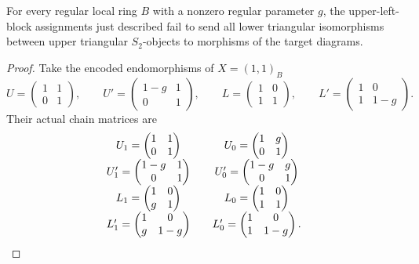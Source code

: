 \begin{lemma}\label{lem:triangular-naturality-failure}
For every regular local ring $B$ with a nonzero regular parameter $g$,
the upper-left-block assignments just described fail to send all
lower triangular isomorphisms between upper triangular $S_2$-objects
to morphisms of the target diagrams.
\end{lemma}

\begin{proof}
Take the encoded endomorphisms of $X=(1,1)_B$
\[
 U=\begin{pmatrix}1&1\\0&1\end{pmatrix},\qquad
 U'=\begin{pmatrix}1-g&1\\0&1\end{pmatrix},\qquad
 L=\begin{pmatrix}1&0\\1&1\end{pmatrix},\qquad
 L'=\begin{pmatrix}1&0\\1&1-g\end{pmatrix}.
\]
Their actual chain matrices are
\[
\begin{array}{c@{\qquad}c}
 U_1=\begin{pmatrix}1&1\\0&1\end{pmatrix}&
 U_0=\begin{pmatrix}1&g\\0&1\end{pmatrix}\\[6pt]
 U'_1=\begin{pmatrix}1-g&1\\0&1\end{pmatrix}&
 U'_0=\begin{pmatrix}1-g&g\\0&1\end{pmatrix}\\[6pt]
 L_1=\begin{pmatrix}1&0\\g&1\end{pmatrix}&
 L_0=\begin{pmatrix}1&0\\1&1\end{pmatrix}\\[6pt]
 L'_1=\begin{pmatrix}1&0\\g&1-g\end{pmatrix}&
 L'_0=\begin{pmatrix}1&0\\1&1-g\end{pmatrix}.

\end{array}\]
\end{proof}

